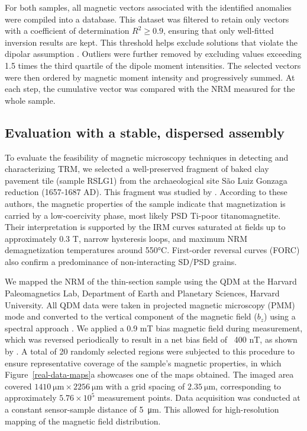 \documentclass[onecolumn,12pt,a4paper]{article}
\begin{document}
For both samples, all magnetic vectors associated with the identified anomalies were compiled into a database. This dataset was filtered to retain only vectors with a coefficient of determination \( R^2 \geq 0.9 \), ensuring that only well-fitted inversion results are kept. This threshold helps exclude solutions that violate the dipolar assumption \citep[\textit{e.g.,}][]{Souza-Junior2024, Fu2020}. Outliers were further removed by excluding values exceeding 1.5 times the third quartile of the dipole moment intensities. The selected vectors were then ordered by magnetic moment intensity and progressively summed. At each step, the cumulative vector was compared with the NRM measured for the whole sample.

\subsection{Evaluation with a stable, dispersed assembly}

To evaluate the feasibility of magnetic microscopy techniques in detecting and characterizing TRM, we selected a well-preserved fragment of baked clay pavement tile (sample RSLG1) from the archaeological site São Luiz Gonzaga reduction (1657-1687 AD). This fragment was studied by \citet{Poletti2016}. According to these authors, the magnetic properties of the sample indicate that magnetization is carried by a low-coercivity phase, most likely PSD Ti-poor titanomagnetite. Their interpretation is supported by the IRM curves saturated at fields up to approximately 0.3 T, narrow hysteresis loops, and maximum NRM demagnetization temperatures around 550°C. First-order reversal curves (FORC) also confirm a predominance of non-interacting SD/PSD grains. 


We mapped the NRM of the thin-section sample using the QDM at the Harvard Paleomagnetics Lab, Department of Earth and Planetary Sciences, Harvard University. All QDM data were taken in projected magnetic microscopy (PMM) mode and converted to the vertical component of the magnetic field ($b_z$) using a spectral approach \citep{Fu2020, Glenn2017, Lima2009}. We applied a 0.9 mT bias magnetic field during measurement, which was reversed periodically to result in a net bias field of ~400 nT, as shown by \citet{Hess2024}. A total of 20 randomly selected regions were subjected to this procedure to ensure representative coverage of the sample's magnetic properties, in which Figure~\ref{real-data-maps}a showcases one of the maps obtained. The imaged area covered \(\qty{1410}{\um} \times \qty{2256}{\um}\) with a grid spacing of \(\qty{2.35}{\um}\), corresponding to approximately \(5.76\times10^{5}\) measurement points. Data acquisition was conducted at a constant sensor-sample distance of \qty{5}{\um}. This allowed for high-resolution mapping of the magnetic field distribution.
\end{document}
